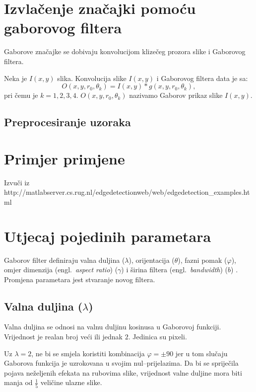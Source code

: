 \documentclass{article}
\newcommand{\engl}[1]{(engl.~\emph{#1})}
\begin{document}
\section{Izvlačenje značajki pomoću gaborovog filtera}
Gaborove značajke se dobivaju konvolucijom klizečeg prozora slike i Gaborovog
filtera.

Neka je $I(x,y)$ slika. Konvolucija slike $I(x,y)$ i Gaborovog filtera data je
sa:
\begin{equation}
O(x,y,r_0, \theta_k) = I(x,y) * g(x,y,r_0, \theta_k),
\label{konvolucija-filter-slika}
\end{equation}
pri čemu je $k = 1, 2, 3, 4$. $O(x,y,r_0, \theta_k)$ nazivamo Gaborov prikaz
slike $I(x,y)$.

\subsection{Preprocesiranje uzoraka}


\section{Primjer primjene}
Izvuči iz http://matlabserver.cs.rug.nl/edgedetectionweb/web/edgedetection\_examples.html

\section{Utjecaj pojedinih parametara}
Gaborov filter definiraju valna duljina ($\lambda$),
orijentacija ($\theta$), fazni pomak ($\varphi$), omjer dimenzija \engl{aspect ratio}
($\gamma $) i širina filtera \engl{bandwidth} ($b$) \citep{petkovgabor}.
Promjena parametara jest stvaranje novog filtera.

\subsection{Valna duljina ($\lambda$)}
Valna duljina se odnosi na valnu duljinu kosinusa u Gaborovoj funkciji.
Vrijednost je realan broj veći ili jednak $2$. Jedinica su pixeli.

Uz $\lambda = 2$, ne bi se smjela koristiti kombinacija $\varphi = \pm 90$ jer u
tom slučaju Gaborova funkcija je uzrokovana u svojim
nul--prijelazima.
Da bi se spriječila pojava neželjenih efekata na rubovima slike, vrijednost valne
duljine mora biti manja od $\frac{1}{5}$ veličine ulazne slike.
\end{document}
